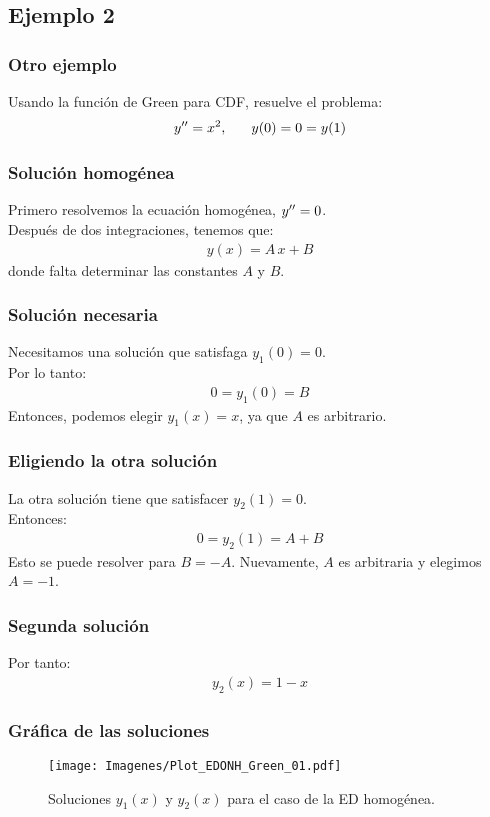 \documentclass[12pt]{beamer}
\begin{document}
\subsection*{Ejemplo 2}

\begin{frame}
\frametitle{Otro ejemplo}
Usando la función de Green para CDF, resuelve el problema:
\pause
\begin{align*}
{y}^{\prime \prime} = x^{2}, \hspace{0.6cm} y (0) = 0 = y (1)
\end{align*}
\end{frame}
\begin{frame}
\frametitle{Solución homogénea}
Primero resolvemos la ecuación homogénea, ${y}^{\prime \prime} = 0$.
\\
\bigskip
\pause
Después de dos integraciones, tenemos que:
\pause
\begin{align*}
y (x) = A \, x + B
\end{align*}
donde falta determinar las constantes $A$ y $B$.
\end{frame}
\begin{frame}
\frametitle{Solución necesaria}
Necesitamos una solución que satisfaga $y_{1} (0) = 0$.
\\
\bigskip
\pause
Por lo tanto:
\pause
\begin{align*}
0 = y_{1} (0) = B
\end{align*}
\pause
Entonces, podemos elegir $y_{1} (x) = x$, ya que $A$ es arbitrario.
\end{frame}
\begin{frame}
\frametitle{Eligiendo la otra solución}
La otra solución tiene que satisfacer $y_{2} (1) = 0$. 
\\
\bigskip
\pause
Entonces:
\pause
\begin{align*}
0 = y_{2} (1) = A + B
\end{align*}
\pause
Esto se puede resolver para $B = - A$. \pause Nuevamente, $A$ es arbitraria y elegimos $A = - 1$.
\end{frame}
\begin{frame}
\frametitle{Segunda solución}
Por tanto:
\pause
\begin{align*}
y_{2} (x) = 1 - x
\end{align*}
\end{frame}
\begin{frame}
\frametitle{Gráfica de las soluciones}
\begin{figure}[H]
    \centering
    \texttt{[image: Imagenes/Plot\_EDONH\_Green\_01.pdf]}
    \caption{Soluciones $y_{1} (x)$ y $y_{2} (x)$ para el caso de la ED homogénea.}
    \label{fig:figura_05}
\end{figure}
\end{frame}
\end{document}
